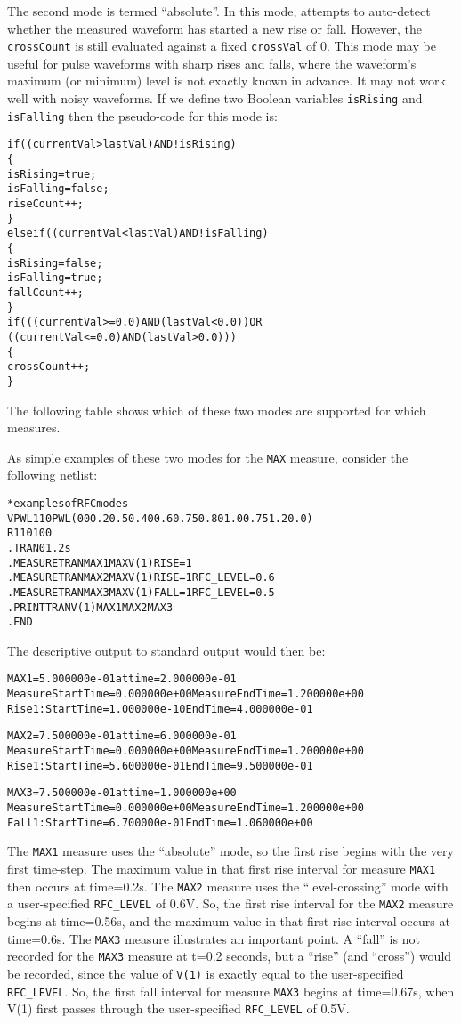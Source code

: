 The second mode is termed ``absolute''. In this mode, \Xyce{} attempts
to auto-detect whether the measured waveform has started a new rise or
fall. However, the \texttt{crossCount} is still evaluated against a
fixed \texttt{crossVal} of 0.  This mode may be useful for pulse
waveforms with sharp rises and falls, where the waveform's maximum (or
minimum) level is not exactly known in advance.  It may not work well
with noisy waveforms.  If we define two Boolean variables
\texttt{isRising} and \texttt{isFalling} then the pseudo-code for this mode is:
\begin{alltt}
if( (currentVal > lastVal) AND !isRising )
\{
  isRising= true;
  isFalling = false;
  riseCount++;
\}
else if( (currentVal < lastVal) AND !isFalling )
\{
  isRising = false;
  isFalling = true;
  fallCount++;
\}
if ( ( (currentVal >= 0.0) AND (lastVal < 0.0) ) OR
     ( (currentVal <= 0.0) AND (lastVal > 0.0) ) )
\{
  crossCount++;
\}
\end{alltt}
The following table shows which of these two modes are supported for which
\Xyce{} measures.

As simple examples of these two modes for the \texttt{MAX} measure, consider
the following netlist:
\begin{alltt}
*examples of RFC modes
VPWL1  1  0 PWL(0 0 0.2 0.5 0.4 0 0.6 0.75 0.8 0 1.0 0.75 1.2 0.0)
R1  1  0  100
.TRAN 0 1.2s
.MEASURE TRAN MAX1 MAX V(1) RISE=1
.MEASURE TRAN MAX2 MAX V(1) RISE=1 RFC_LEVEL=0.6
.MEASURE TRAN MAX3 MAX V(1) FALL=1 RFC_LEVEL=0.5
.PRINT TRAN V(1) MAX1 MAX2 MAX3
.END
\end{alltt}
The descriptive output to standard output would then be:
\begin{alltt}
MAX1 = 5.000000e-01 at time = 2.000000e-01
Measure Start Time= 0.000000e+00        Measure End Time= 1.200000e+00
Rise 1: Start Time= 1.000000e-10        End Time= 4.000000e-01

MAX2 = 7.500000e-01 at time = 6.000000e-01
Measure Start Time= 0.000000e+00        Measure End Time= 1.200000e+00
Rise 1: Start Time= 5.600000e-01        End Time= 9.500000e-01

MAX3 = 7.500000e-01 at time = 1.000000e+00
Measure Start Time= 0.000000e+00        Measure End Time= 1.200000e+00
Fall 1: Start Time= 6.700000e-01        End Time= 1.060000e+00
\end{alltt}
The \texttt{MAX1} measure uses the ``absolute'' mode, so the first
rise begins with the very first time-step.  The maximum value in that
first rise interval for measure \texttt{MAX1} then occurs at
time=0.2s.  The \texttt{MAX2} measure uses the ``level-crossing'' mode
with a user-specified \texttt{RFC\_LEVEL} of 0.6V.  So, the first rise
interval for the \texttt{MAX2} measure begins at time=0.56s, and the
maximum value in that first rise interval occurs at time=0.6s.  The
\texttt{MAX3} measure illustrates an important point.  A ``fall'' is not
recorded for the \texttt{MAX3} measure at t=0.2 seconds, but a
``rise'' (and ``cross'') would be recorded, since the value
of \texttt{V(1)} is exactly equal to the
user-specified \texttt{RFC\_LEVEL}. So, the first fall interval for
measure
\texttt{MAX3} begins at time=0.67s, when V(1) first passes through the
user-specified \texttt{RFC\_LEVEL} of 0.5V.

